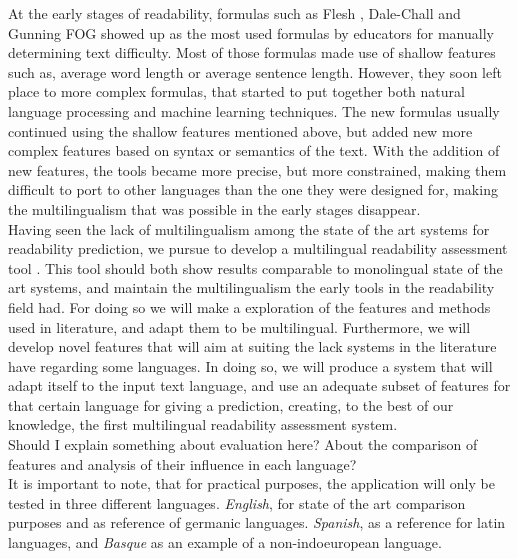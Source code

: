 \documentclass[12pt]{article}
\begin{document}
At the early stages of readability, formulas such as Flesh \cite{flesch1948new}, Dale-Chall \cite{chall1995readability} and Gunning FOG  \cite{albright1996readability} showed up as the most used formulas by educators for manually determining text difficulty. Most of those formulas made use of shallow features such as, average word length or average sentence length. However, they soon left place to more complex formulas\cite{franccois2012ai}\cite{aluisio2010readability}, that started to put together both natural language processing and machine learning techniques. The new formulas usually continued using the shallow  features  mentioned above, but added new more complex features based on syntax or semantics of the text. With the addition of new features, the tools became more precise, but more constrained, making them difficult to port to other languages than the one they were designed for, making the multilingualism that was possible in the early stages disappear.  \\


Having seen the lack of multilingualism among the state of the art systems for readability prediction, we pursue to develop a multilingual readability assessment tool . This tool should both show results comparable to monolingual state of the art systems,  and  maintain the multilingualism the early tools in the readability field had. For doing so we will make a exploration of the features and methods used in literature, and adapt them to be multilingual. Furthermore, we will develop novel features that will aim at suiting the lack systems in the literature have regarding some languages. In doing so, we will produce a system that will adapt itself to the input text language, and use an adequate subset of features for that certain language for giving a prediction, creating, to the best of our knowledge, the first multilingual readability assessment system.\\

{\color{red}Should I explain something about evaluation here? About the comparison of features and analysis of their influence in each language?}\\

It is important to note, that for practical purposes, the application will only be tested in three different languages. \textit{English}, for state of the art comparison purposes and as reference of germanic languages. \textit{Spanish}, as a reference for latin languages, and \textit{Basque} as an example of a non-indoeuropean language.
\end{document}
